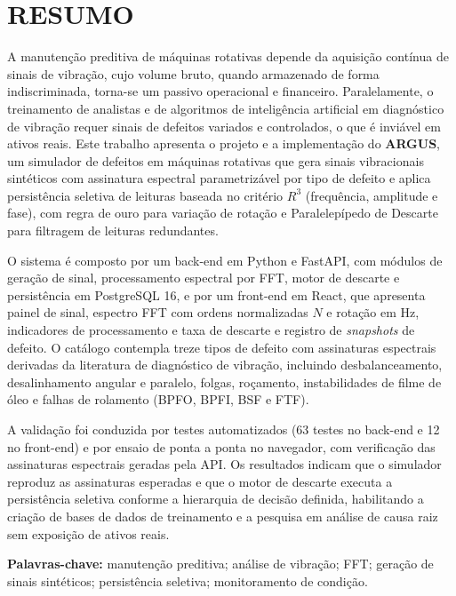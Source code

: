 \chapter*{RESUMO}

A manuten\c{c}\~ao preditiva de m\'aquinas rotativas depende da aquisi\c{c}\~ao
cont\'inua de sinais de vibra\c{c}\~ao, cujo volume bruto, quando armazenado de
forma indiscriminada, torna-se um passivo operacional e financeiro. Paralelamente,
o treinamento de analistas e de algoritmos de intelig\^encia artificial em
diagn\'ostico de vibra\c{c}\~ao requer sinais de defeitos variados e
controlados, o que \'e invi\'avel em ativos reais. Este trabalho apresenta o
projeto e a implementa\c{c}\~ao do \textbf{ARGUS}, um simulador de defeitos em
m\'aquinas rotativas que gera sinais vibracionais sint\'eticos com assinatura
espectral parametriz\'avel por tipo de defeito e aplica persist\^encia seletiva
de leituras baseada no crit\'erio \(R^3\) (frequ\^encia, amplitude e fase), com
regra de ouro para varia\c{c}\~ao de rota\c{c}\~ao e Paralelep\'ipedo de
Descarte para filtragem de leituras redundantes.

O sistema \'e composto por um back-end em Python e FastAPI, com m\'odulos de
gera\c{c}\~ao de sinal, processamento espectral por FFT, motor de descarte e
persist\^encia em PostgreSQL 16, e por um front-end em React, que apresenta
painel de sinal, espectro FFT com ordens normalizadas \(N\) e rota\c{c}\~ao em
Hz, indicadores de processamento e taxa de descarte e registro de \emph{snapshots}
de defeito. O cat\'alogo contempla treze tipos de defeito com assinaturas
espectrais derivadas da literatura de diagn\'ostico de vibra\c{c}\~ao, incluindo
desbalanceamento, desalinhamento angular e paralelo, folgas, ro\c{c}amento,
instabilidades de filme de \'oleo e falhas de rolamento (BPFO, BPFI, BSF e FTF).

A valida\c{c}\~ao foi conduzida por testes automatizados (63 testes no
back-end e 12 no front-end) e por ensaio de ponta a ponta no navegador, com
verifica\c{c}\~ao das assinaturas espectrais geradas pela API. Os resultados
indicam que o simulador reproduz as assinaturas esperadas e que o motor de
descarte executa a persist\^encia seletiva conforme a hierarquia de decis\~ao
definida, habilitando a cria\c{c}\~ao de bases de dados de treinamento e a
pesquisa em an\'alise de causa raiz sem exposi\c{c}\~ao de ativos reais.

\vspace{0.6cm}
\noindent\textbf{Palavras-chave:} manuten\c{c}\~ao preditiva; an\'alise de
vibra\c{c}\~ao; FFT; gera\c{c}\~ao de sinais sint\'eticos; persist\^encia
seletiva; monitoramento de condi\c{c}\~ao.
